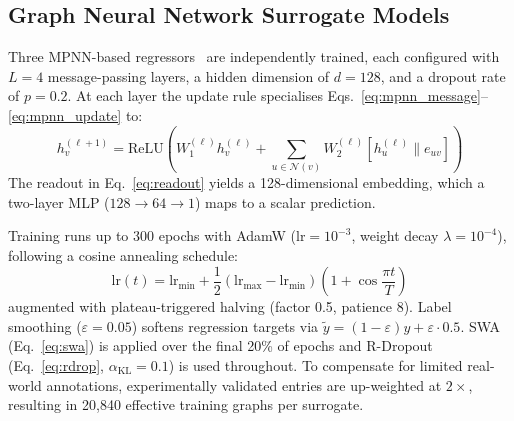 \documentclass[twocolumn,10pt]{article}
\begin{document}
\subsection{Graph Neural Network Surrogate Models}
Three MPNN-based regressors~\cite{gilmer2017neural} are independently trained, each configured
with $L=4$ message-passing layers, a hidden dimension of $d=128$, and a dropout rate of
$p=0.2$. At each layer the update rule specialises Eqs.~\ref{eq:mpnn_message}--\ref{eq:mpnn_update} to:
\begin{equation}
h_v^{(\ell+1)} = \text{ReLU}\!\left(W_1^{(\ell)} h_v^{(\ell)} + \!\!\sum_{u \in \mathcal{N}(v)}\!\! W_2^{(\ell)} [h_u^{(\ell)} \| e_{uv}]\right)
\end{equation}
The readout in Eq.~\ref{eq:readout} yields a 128-dimensional embedding, which a two-layer
MLP ($128 \to 64 \to 1$) maps to a scalar prediction.

Training runs up to 300 epochs with AdamW (lr$=10^{-3}$, weight decay $\lambda = 10^{-4}$),
following a cosine annealing schedule:
\begin{equation}
\text{lr}(t) = \text{lr}_\text{min} + \frac{1}{2}(\text{lr}_\text{max} - \text{lr}_\text{min})\left(1 + \cos\frac{\pi t}{T}\right)
\end{equation}
augmented with plateau-triggered halving (factor 0.5, patience 8). Label smoothing
($\varepsilon = 0.05$) softens regression targets via $\tilde{y} = (1 - \varepsilon)y + \varepsilon \cdot 0.5$.
SWA (Eq.~\ref{eq:swa}) is applied over the final 20\% of epochs and R-Dropout
(Eq.~\ref{eq:rdrop}, $\alpha_\text{KL} = 0.1$) is used throughout. To compensate for
limited real-world annotations, experimentally validated entries are up-weighted at
$2\times$, resulting in 20,840 effective training graphs per surrogate.

\begin{table}[!ht]
\centering
\caption{Surrogate model performance on held-out validation sets.}
\label{tab:surrogates}
\end{table}
\end{document}
